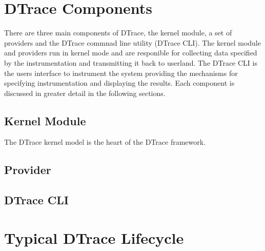 \section{DTrace Components}

There are three main components of DTrace, the kernel module, a set of providers and the DTrace commnad line utility (DTrace CLI). The kernel module and providers run in kernel mode and are responible for collecting data specified by the instrumentation and transmitting it back to userland. The DTrace CLI is the users interface to instrument the system providing the mechanisms for specifying instrumentation and displaying the results. Each component is discussed in greater detail in the following sections.

\subsection{Kernel Module}

The DTrace kernel model is the heart of the DTrace framework. 


\subsection{Provider}


\subsection{DTrace CLI}


\section{Typical DTrace Lifecycle}




